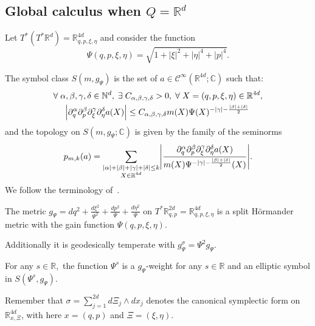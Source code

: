 \documentclass[AHL,Unicode,longabstracts]{cedram}
\newcommand{\C}{\mathbb{C}}
\newcommand{\R}{\mathbb{R}}
\newcommand{\N}{\mathbb{N}}
\newcommand{\clC}{\mathcal{C}}
\let\oldexists\exists
\renewcommand*{\exists}{\mathrel{\oldexists}}
\let\oldforall\forall
\renewcommand*{\forall}{\mathrel{\oldforall}}
\let\originalleft\left
\let\originalright\right
\renewcommand{\left}{\mathopen{}\mathclose\bgroup\originalleft}
\renewcommand{\right}{\aftergroup\egroup\originalright}
\begin{document}
\subsection{Global calculus when \texorpdfstring{$Q=\R^d$}{Q=R\^d}}\label{sec:globpseudodiff}

Let $T^{*}(T^{*}\R^{d})=\R^{4d}_{q,p,\xi,\eta}$ and consider the function
\[
\Psi(q,p,\xi,\eta)=\sqrt{1+|\xi|^{2}+|\eta|^{4}+|p|^{4}}.
\]

The symbol class $S(m,g_{\Psi})$ is the set of $a\in \clC^{\infty}(\R^{4d};\C)$ such that:
\begin{multline*}
\forall \alpha,\beta,\gamma,\delta\in \N^{d},\; \exists C_{\alpha,\beta,\gamma,\delta}>0,\; \forall X=(q,p,\xi,\eta)\in \R^{4d},\\
\left|\partial_{q}^{\alpha}\partial_{p}^{\beta}\partial_{\xi}^{\gamma}\partial_{\eta}^{\delta}a(X)\right|
\leq C_{\alpha,\beta,\gamma,\delta}m(X)\Psi(X)^{-|\gamma|-\frac{|\beta|+|\delta|}{2}}\,
\end{multline*}
and the topology on $S(m,g_{\Psi};\C)$ is given by the family of the seminorms
\[
p_{m,k}(a)=\sum_{\substack{|\alpha|+|\beta|+|\gamma|+|\delta|\leq k\\X\in \R^{4d}}}\left|\frac{\partial_{q}^{\alpha}\partial_{p}^{\beta}\partial_{\xi}^{\gamma}\partial_{\eta}^{\delta}a(X)}{m(X) \Psi^{-|\gamma|-\frac{|\beta|+|\delta|}{2}}(X)} \right|.
\]
We follow the terminology of~\cite{Bon}.
\begin{prop}\label{pr:Hormmetric}
The metric $g_{\Psi}=dq^{2}+\frac{d\xi^{2}}{\Psi^{2}}+\frac{dp^{2}}{\Psi}+\frac{d\eta^{2}}{\Psi}$ on $T^{*}\R^{2d}_{q,p}=\R^{4d}_{q,p,\xi,\eta}$ is a split H\"ormander metric with the gain function $\Psi(q,p,\xi,\eta)$.

Additionally it is geodesically temperate with $g^{\sigma}_{\Psi}=\Psi^{2}g_{\Psi}$.

For any $s\in \R$,\, the function $\Psi^{s}$ is a $g_{\Psi}$-weight for any $s\in \R$ and an elliptic symbol in $S(\Psi^{s},g_{\Psi})$.
\end{prop}

Remember that $\sigma=\sum_{j=1}^{2d}d\Xi_{j}\wedge dx_{j}$ denotes the canonical symplectic form on $\R^{4d}_{x,\Xi}$, with here $x=(q,p)$ and $\Xi=(\xi,\eta)$.
\end{document}

